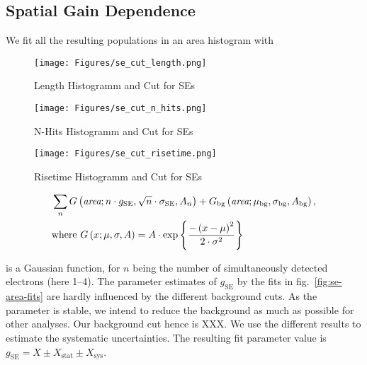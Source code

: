 
\FloatBarrier
\subsection{Spatial Gain Dependence}
\label{ssec:g2}
\FloatBarrier

We fit all the resulting populations in an area histogram with %

\begin{figure}
    \centering
    \texttt{[image: Figures/se\_cut\_length.png]}  %
    \caption[Length Histogramm and Cut for SEs]{
        Length Histogramm and Cut for SEs
    }
    \label{fig:len-cut-se}
\end{figure}


\begin{figure}
    \centering
    \texttt{[image: Figures/se\_cut\_n\_hits.png]}  %
    \caption[N-Hits Histogramm and Cut for SEs]{
        N-Hits Histogramm and Cut for SEs
    }
    \label{fig:hit-cut-se}
\end{figure}


\begin{figure}
    \centering
    \texttt{[image: Figures/se\_cut\_risetime.png]}  %
    \caption[Risetime Histogramm and Cut for SEs]{
        Risetime Histogramm and Cut for SEs
    }
    \label{fig:riset-cut-se}
\end{figure}


\begin{align}
    &\sum_{n} G \left(  \textit{area}; n \cdot g_\mathrm{SE}, \sqrt{n} \cdot \sigma_\mathrm{SE}, A_n \right) +
    G_\mathrm{bg} \left( \textit{area};  \mu_\mathrm{bg}, \sigma_\mathrm{bg}, A_\mathrm{bg} \right), \\
    &\mathrm{where~} G \left( x;  \mu, \sigma, A \right) = A \cdot \exp{ \left\{ \frac{-\left( x - \mu \right)^2}{2\cdot\sigma^2} \right\} }
    \label{eq:se-fit-model}
\end{align}


is a Gaussian function, for $ n $ being the number of simultaneously detected electrons (here \numrange{1}{4}).
The parameter estimates of $ g_\mathrm{SE} $ by the fits in fig.~\ref{fig:se-area-fits} are hardly influenced by the different background cuts.
As the parameter is stable, we intend to reduce the background as much as possible for other analyses.
Our background cut hence is XXX.  %
We use the different results to estimate the systematic uncertainties.
The resulting fit parameter value is $ g_\mathrm{SE} = X \pm X_\mathrm{stat} \pm X_\mathrm{sys} $.  %

